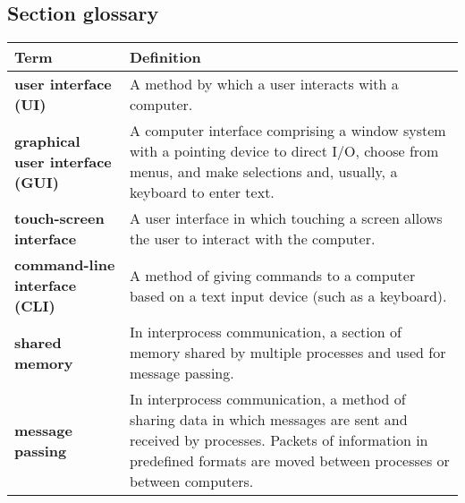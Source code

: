 \subsection*{Section glossary}
\centering
\begin{tabular}{>{\raggedright}p{} >{\raggedright\arraybackslash}p{}}
\toprule
\textbf{Term} & \textbf{Definition} \\
\midrule
\textbf{user interface (UI)} & A method by which a user interacts with a computer. \\
\textbf{graphical user interface (GUI)} & A computer interface comprising a window system with a pointing device to direct I/O, choose from menus, and make selections and, usually, a keyboard to enter text. \\
\textbf{touch-screen interface} & A user interface in which touching a screen allows the user to interact with the computer. \\
\textbf{command-line interface (CLI)} & A method of giving commands to a computer based on a text input device (such as a keyboard). \\
\textbf{shared memory} & In interprocess communication, a section of memory shared by multiple processes and used for message passing. \\
\textbf{message passing} & In interprocess communication, a method of sharing data in which messages are sent and received by processes. Packets of information in predefined formats are moved between processes or between computers. \\
\bottomrule
\end{tabular}
\vspace{\baselineskip}
